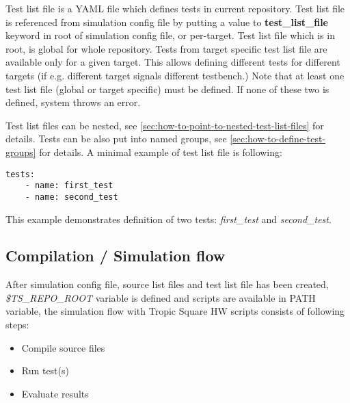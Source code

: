 \documentclass{tropic_design_spec}
\begin{document}
Test list file is a YAML file which defines tests in current repository.
Test list file is referenced from simulation config file by putting a value to
\textbf{test_list_file} keyword in root of simulation config file, or per-target. Test
list file which is in root, is global for whole repository. Tests from target specific
test list file are available only for a given target. This allows defining different
tests for different targets (if e.g. different target signals different testbench.)
Note that at least one test list file (global or target specific) must be defined.
If none of these two is defined, system throws an error.

Test list files can be nested, see \ref{sec:how-to-point-to-nested-test-list-files}
for details. Tests can be also put into named groups, see 
\ref{sec:how-to-define-test-groups} for details. A minimal example of test list file
is following:

\begin{lstlisting}
tests:
    - name: first_test
    - name: second_test
\end{lstlisting}

This example demonstrates definition of two tests: \textit{first_test} and 
\textit{second_test}.



\subsection{Compilation / Simulation flow}
\label{sec:compilation-simulation-flow}

After simulation config file, source list files and test list file has been created,
\textit{\$TS_REPO_ROOT} variable is defined and scripts are available in PATH variable,
the simulation flow with Tropic Square HW scripts consists of following steps:
\begin{itemize}
    \item{Compile source files}
    \item{Run test(s)}
    \item{Evaluate results}
\end{itemize}
\end{document}
